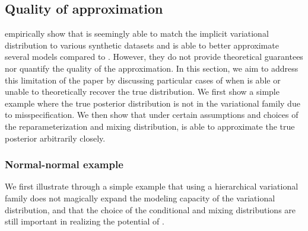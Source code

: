 \documentclass[10pt]{article}
\begin{document}
\subsection{Quality of approximation} \label{sec:approximation}

\citet{Titsias:2019} empirically show that \uivi is seemingly able to match the implicit variational distribution to various synthetic datasets and is able to better approximate several models compared to \sivi. However, they do not provide theoretical guarantees nor quantify the quality of the \uivi approximation. In this section, we aim to address this limitation of the paper by discussing particular cases of when \uivi is able or unable to theoretically recover the true distribution. We first show a simple example where the true posterior distribution is not in the variational family due to misspecification. We then show that under certain assumptions and choices of the reparameterization and mixing distribution, \uivi is able to approximate the true posterior arbitrarily closely.

\subsubsection{Normal-normal example}

We first illustrate through a simple example that using a hierarchical variational family does not magically expand the modeling capacity of the variational distribution, and that the choice of the conditional and mixing distributions are still important in realizing the potential of \uivi.
\\
\end{document}
